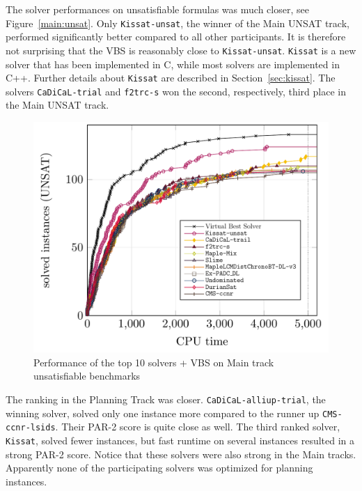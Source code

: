 \documentclass{elsarticle}
\newcommand{\solver}[1]{\texttt{#1}}
\begin{document}
The solver performances on unsatisfiable formulas was much closer,
see Figure~\ref{main:unsat}. Only \solver{Kissat-unsat}, the winner of the Main UNSAT track, 
performed significantly better compared to all other participants. It is therefore not surprising
that the VBS is reasonably close to \solver{Kissat-unsat}. \solver{Kissat} is a new solver that has been implemented in C, while most solvers are implemented in C++. Further 
details about \solver{Kissat} are described in Section~\ref{sec:kissat}.
The solvers \solver{CaDiCaL-trial}
and \solver{f2trc-s} won the second, respectively, third place in the Main UNSAT track.

\begin{figure}[ht]
\centering
\includegraphics[width=.9\textwidth]{img/paper-main-top10-UNSAT.pdf}
\caption{Performance of the top 10 solvers + VBS on Main track unsatisfiable benchmarks}
\end{figure}
\label{main:unsat}

The ranking in the Planning Track was closer. \solver{CaDiCaL-alliup-trial}, the winning solver, 
solved only one instance more compared to the runner up \solver{CMS-ccnr-lsids}. Their PAR-2 score is 
quite close as well. The third ranked solver, \solver{Kissat}, solved fewer instances, but fast runtime
on several instances resulted in a strong PAR-2 score. Notice that these solvers were also strong in the Main tracks. 
Apparently none of the participating solvers was optimized for planning instances. 
\end{document}
